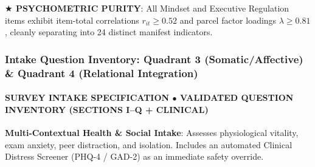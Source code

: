 \documentclass[aspectratio=169, 10pt]{beamer}
\begin{document}
\begin{frame}
  \begin{takeawaybanner}
    \textbf{\color{GoldPill}$\bigstar$ PSYCHOMETRIC PURITY}: All Mindset and Executive Regulation items exhibit item-total correlations $r_{it} \ge 0.52$ and parcel factor loadings $\lambda \ge 0.81$, cleanly separating into 24 distinct manifest indicators.
  \end{takeawaybanner}
\end{frame}

\begin{frame}
  \frametitle{Intake Question Inventory: Quadrant 3 (Somatic/Affective) \& Quadrant 4 (Relational Integration)}
  \framesubtitle{SURVEY INTAKE SPECIFICATION $\bullet$ VALIDATED QUESTION INVENTORY (SECTIONS I--Q + CLINICAL)}

  \begin{topsummarybar}
    \fontsize{6.5pt}{7.8pt}\selectfont
    \textbf{\color{NavyDark}Multi-Contextual Health \& Social Intake}: Assesses physiological vitality, exam anxiety, peer distraction, and isolation. Includes an automated Clinical Distress Screener (PHQ-4 / GAD-2) as an immediate safety override.
  \end{topsummarybar}
  \vspace{-0.30cm}


\end{frame}
\end{document}

